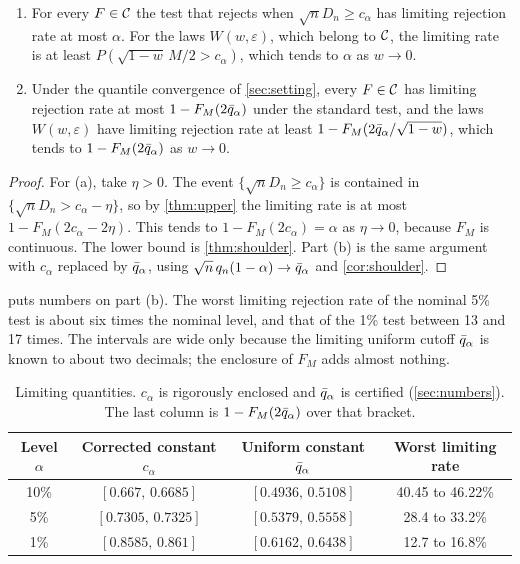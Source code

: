 \begin{corollary}\label{cor:lf}
\begin{enumerate}[label=(\alph*),leftmargin=*]
\item For every $F\in\mathcal{C}$ the test that rejects when $\sqrt nD_n\ge c_\alpha$ has limiting rejection rate at most $\alpha$. For the laws $W(w,\varepsilon)$, which belong to $\mathcal{C}$, the limiting rate is at least $P(\sqrt{1-w}\,M/2>c_\alpha)$, which tends to $\alpha$ as $w\to0$.
\item Under the quantile convergence of \cref{sec:setting}, every $F\in\mathcal{C}$ has limiting rejection rate at most $1-F_M(2\bar q_\alpha)$ under the standard test, and the laws $W(w,\varepsilon)$ have limiting rejection rate at least $1-F_M(2\bar q_\alpha/\sqrt{1-w})$, which tends to $1-F_M(2\bar q_\alpha)$ as $w\to0$.
\end{enumerate}
\end{corollary}
\begin{proof}
For (a), take $\eta>0$. The event $\{\sqrt nD_n\ge c_\alpha\}$ is contained in $\{\sqrt nD_n>c_\alpha-\eta\}$, so by \cref{thm:upper} the limiting rate is at most $1-F_M(2c_\alpha-2\eta)$. This tends to $1-F_M(2c_\alpha)=\alpha$ as $\eta\to0$, because $F_M$ is continuous. The lower bound is \cref{thm:shoulder}. Part (b) is the same argument with $c_\alpha$ replaced by $\bar q_\alpha$, using $\sqrt n\,q_n(1-\alpha)\to\bar q_\alpha$ and \cref{cor:shoulder}.
\end{proof}

 puts numbers on part (b). The worst limiting rejection rate of the nominal 5\% test is about six times the nominal level, and that of the 1\% test between 13 and 17 times. The intervals are wide only because the limiting uniform cutoff $\bar q_\alpha$ is known to about two decimals; the enclosure of $F_M$ adds almost nothing.

\begin{table}[t]
\centering
\small
\caption{Limiting quantities. $c_\alpha$ is rigorously enclosed and $\bar q_\alpha$ is certified (\cref{sec:numbers}). The last column is $1-F_M(2\bar q_\alpha)$ over that bracket.}
\label{tab:size}
\begin{tabular}{cccc}
\toprule
Level $\alpha$ & Corrected constant $c_\alpha$ & Uniform constant $\bar q_\alpha$ & Worst limiting rate \\
\midrule
10\% & $[0.667,\,0.6685]$ & $[0.4936,\,0.5108]$ & 40.45 to 46.22\% \\
5\% & $[0.7305,\,0.7325]$ & $[0.5379,\,0.5558]$ & 28.4 to 33.2\% \\
1\% & $[0.8585,\,0.861]$ & $[0.6162,\,0.6438]$ & 12.7 to 16.8\% \\
\bottomrule
\end{tabular}
\end{table}

